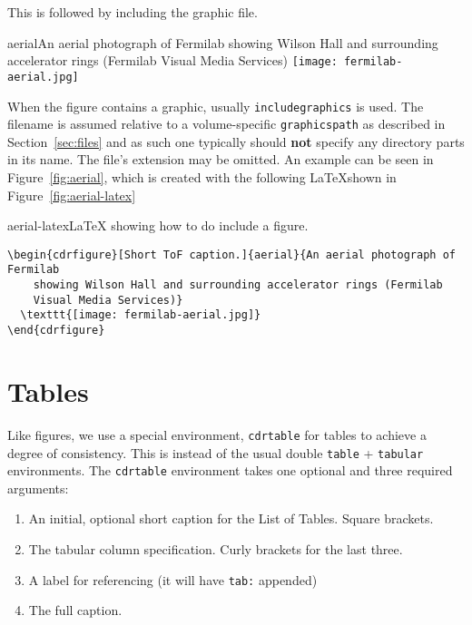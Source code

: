 This is followed by including the graphic file.

\begin{cdrfigure}{aerial}{An aerial photograph of Fermilab
    showing Wilson Hall and surrounding accelerator rings (Fermilab
    Visual Media Services)}
  \texttt{[image: fermilab-aerial.jpg]}
\end{cdrfigure}


When the figure contains a graphic,  usually \texttt{includegraphics} is used.
The filename is assumed relative to a volume-specific \texttt{graphicspath} as
described in Section~\ref{sec:files} and as such one typically should
\textbf{not} specify any directory parts in its name.
The file's extension may be omitted.
An example can be seen in Figure~\ref{fig:aerial}, which is created
with the following \LaTeX shown in Figure~\ref{fig:aerial-latex}

\begin{cdrfigure}{aerial-latex}{\LaTeX{} showing how to do include a figure.}
\begin{verbatim}
\begin{cdrfigure}[Short ToF caption.]{aerial}{An aerial photograph of Fermilab
    showing Wilson Hall and surrounding accelerator rings (Fermilab
    Visual Media Services)}
  \texttt{[image: fermilab-aerial.jpg]}
\end{cdrfigure}
\end{verbatim}
\end{cdrfigure}

\FloatBarrier
\section{Tables}
\label{sec:tables}

Like figures, we use a special environment, \texttt{cdrtable} for
tables to achieve a degree of consistency.
This is instead of the usual double \texttt{table} + \texttt{tabular} environments.
The \texttt{cdrtable} environment takes one optional and three
required arguments:

\begin{enumerate}
\item An initial, optional short caption for the List of Tables. Square brackets.
\item The tabular column specification. Curly brackets for the last three.
\item A label for referencing (it will have \texttt{tab:} appended)
\item The full caption.
\end{enumerate}

